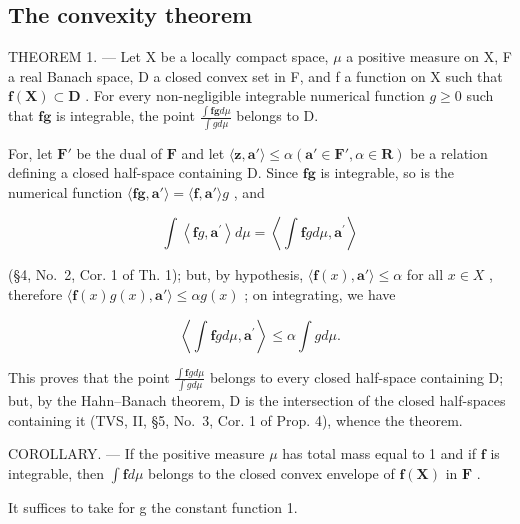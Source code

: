 \subsection{The convexity theorem}

THEOREM 1. --- Let X be a locally compact space, \(\mu\) a positive measure on X, F a real Banach space, D a closed convex set in F, and f a function on X such that \(\mathbf{f}(\mathbf{X}) \subset \mathbf{D}\) . For every non-negligible integrable numerical function \(g \geqslant 0\) such that \(\mathbf{fg}\) is integrable, the point \(\frac{\int \mathbf{fg} d\mu}{\int g d\mu}\) belongs to D.

For, let \(\mathbf{F}'\) be the dual of \(\mathbf{F}\) and let \(\langle \mathbf{z},\mathbf{a}'\rangle \leqslant \alpha (\mathbf{a}'\in \mathbf{F}',\alpha \in \mathbf{R})\) be a relation defining a closed half-space containing D. Since \(\mathbf{fg}\) is integrable, so is the numerical function \(\langle \mathbf{fg},\mathbf{a}'\rangle = \langle \mathbf{f},\mathbf{a}'\rangle g\) , and

\[
\int \left\langle \mathbf {f} g, \mathbf {a} ^ {\prime} \right\rangle d \mu = \left\langle \int \mathbf {f} g d \mu , \mathbf {a} ^ {\prime} \right\rangle
\]

(§4, No.~2, Cor. 1 of Th. 1); but, by hypothesis, \(\langle \mathbf{f}(x), \mathbf{a}' \rangle \leqslant \alpha\) for all \(x \in X\) , therefore \(\langle \mathbf{f}(x)g(x), \mathbf{a}' \rangle \leqslant \alpha g(x)\) ; on integrating, we have

\[
\left\langle \int \mathbf {f} g d \mu , \mathbf {a} ^ {\prime} \right\rangle \leqslant \alpha \int g d \mu .
\]

This proves that the point \(\frac{\int\mathbf{f}g d\mu}{\int g d\mu}\) belongs to every closed half-space containing D; but, by the Hahn--Banach theorem, D is the intersection of the closed half-spaces containing it (TVS, II, §5, No.~3, Cor. 1 of Prop. 4), whence the theorem.

COROLLARY. --- If the positive measure \(\mu\) has total mass equal to 1 and if \(\mathbf{f}\) is integrable, then \(\int \mathbf{f} d\mu\) belongs to the closed convex envelope of \(\mathbf{f}(\mathbf{X})\) in \(\mathbf{F}\) .

It suffices to take for g the constant function 1.

